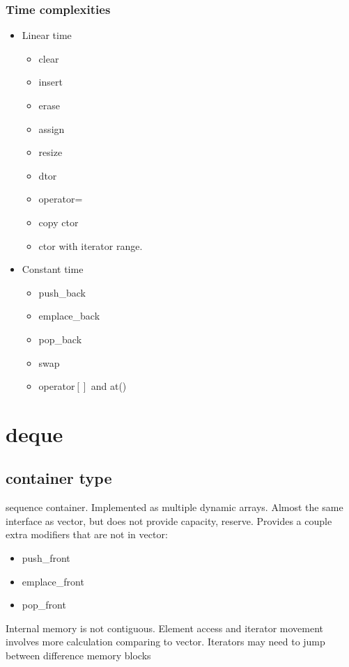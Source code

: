 \documentclass{report}
\begin{document}
    \subsubsection{Time complexities}
    \begin{itemize}
        \item Linear time
            \begin{itemize}[label=$\circ$]
            \item clear
            \item insert
            \item erase
            \item assign
            \item resize
            \item dtor
            \item operator=
            \item copy ctor
            \item ctor with iterator range.
            \end{itemize}
            \item Constant time
                \begin{itemize}[label=$\circ$]
                    \item push\_back
                    \item emplace\_back
                    \item pop\_back
                    \item swap
                    \item operator$[]$ and at()
                \end{itemize}
    \end{itemize}
    \section{deque}
    \subsection{container type} 
    sequence container. Implemented as multiple dynamic arrays.
    \bigbreak \noindent
    Almost the same interface as vector, but does not provide capacity, reserve.
    \bigbreak \noindent
    Provides a couple extra modifiers that are not in vector:
    \begin{itemize}
        \item push\_front
        \item emplace\_front
        \item pop\_front
    \end{itemize}
    Internal memory is not contiguous. Element access and iterator movement involves more calculation comparing to vector. Iterators may need to jump between difference memory blocks
\end{document}
